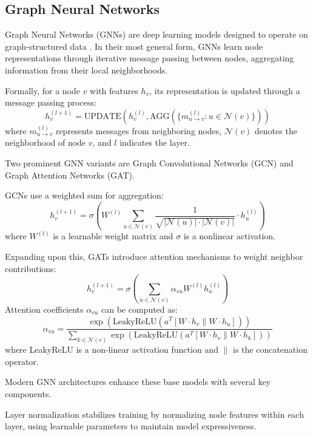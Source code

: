 \documentclass[letterpaper]{article}
\begin{document}
\subsection{Graph Neural Networks}
Graph Neural Networks (GNNs) are deep learning models designed to operate on graph-structured data \citep{scarselli2008graph}. In their most general form, GNNs learn node representations through iterative message passing between nodes, aggregating information from their local neighborhoods. 

Formally, for a node $v$ with features $h_v$, its representation is updated through a message passing process:
\begin{equation*}
    h_v^{(l+1)} = \text{UPDATE}(h_v^{(l)}, \text{AGG}(\{m_{u\rightarrow v}^{(l)} : u \in \mathcal{N}(v)\}))
\end{equation*}
where $m_{u\rightarrow v}^{(l)}$ represents messages from neighboring nodes, $\mathcal{N}(v)$ denotes the neighborhood of node $v$, and $l$ indicates the layer.

Two prominent GNN variants are Graph Convolutional Networks (GCN) and Graph Attention Networks (GAT). 

GCNs \citep{kipf2016semi} use a weighted sum for aggregation:
\begin{equation*}
    h_v^{(l+1)} = \sigma \left( W^{(l)} \sum_{u \in \mathcal{N}(v)} \frac{1}{\sqrt{|\mathcal{N}(u)|\cdot|\mathcal{N}(v)|}} \cdot h_u^{(l)} \right)
\end{equation*}
where $W^{(l)}$ is a learnable weight matrix and $\sigma$ is a nonlinear activation.

Expanding upon this, GATs \citep{velivckovic2017graph} introduce attention mechanisms to weight neighbor contributions:
\begin{equation*}
    h_v^{(l+1)} = \sigma \left( \sum_{u \in \mathcal{N}(v)} \alpha_{vu} W^{(l)} h_u^{(l)} \right)
\end{equation*}
Attention coefficients $\alpha_{vu}$ can be computed as:
\begin{equation*}
    \alpha_{vu} = \frac{\exp(\text{LeakyReLU}(a^T[W \cdot h_v \| W \cdot h_u]))}{\sum_{k \in \mathcal{N}(v)} \exp(\text{LeakyReLU}(a^T[W \cdot h_v \| W \cdot h_k]))}
\end{equation*}
where LeakyReLU is a non-linear activation function and $\|$ is the concatenation operator.

Modern GNN architectures enhance these base models with several key components. 

Layer normalization stabilizes training by normalizing node features within each layer, using learnable parameters to maintain model expressiveness. 
\end{document}
